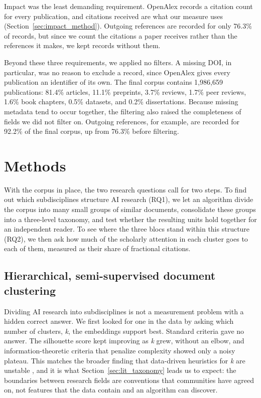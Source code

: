 \documentclass[10pt,twocolumn,a4paper]{article}
\begin{document}
	Impact was the least demanding requirement. OpenAlex records a citation count for every publication, and citations received are what our measure uses (Section~\ref{sec:impact_method}). Outgoing references are recorded for only 76.3\% of records, but since we count the citations a paper receives rather than the references it makes, we kept records without them.
	
	Beyond these three requirements, we applied no filters. A missing DOI, in particular, was no reason to exclude a record, since OpenAlex gives every publication an identifier of its own. The final corpus contains 1,986,659 publications: 81.4\% articles, 11.1\% preprints, 3.7\% reviews, 1.7\% peer reviews, 1.6\% book chapters, 0.5\% datasets, and 0.2\% dissertations. Because missing metadata tend to occur together, the filtering also raised the completeness of fields we did not filter on. Outgoing references, for example, are recorded for 92.2\% of the final corpus, up from 76.3\% before filtering.
	
	\section{Methods}
	\label{sec:methods}
	
	With the corpus in place, the two research questions call for two steps. To find out which subdisciplines structure AI research (RQ1), we let an algorithm divide the corpus into many small groups of similar documents, consolidate these groups into a three-level taxonomy, and test whether the resulting units hold together for an independent reader. To see where the three blocs stand within this structure (RQ2), we then ask how much of the scholarly attention in each cluster goes to each of them, measured as their share of fractional citations.
	
	\subsection{Hierarchical, semi-supervised document clustering}
	\label{sec:clustering}
	
	Dividing AI research into subdisciplines is not a measurement problem with a hidden correct answer. We first looked for one in the data by asking which number of clusters, \textit{k}, the embeddings support best. Standard criteria gave no answer. The silhouette score kept improving as \textit{k} grew, without an elbow, and information-theoretic criteria that penalize complexity showed only a noisy plateau. This matches the broader finding that data-driven heuristics for \textit{k} are unstable \parencite{bulatov2024determination}, and it is what Section~\ref{sec:lit_taxonomy} leads us to expect: the boundaries between research fields are conventions that communities have agreed on, not features that the data contain and an algorithm can discover.
	
\end{document}
